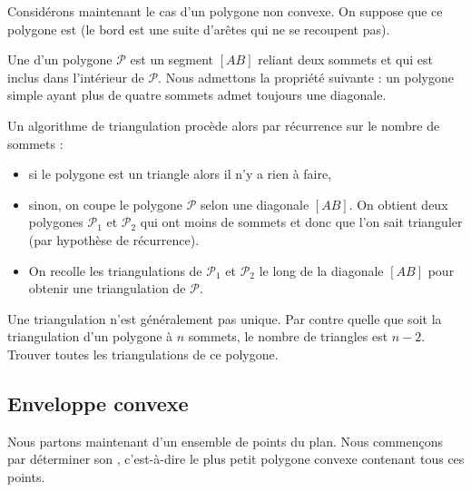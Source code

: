\documentclass[11pt,class=report,crop=false]{standalone}
\begin{document}

Considérons maintenant le cas d'un polygone non convexe. On suppose que ce polygone est  (le bord est une suite d'arêtes qui ne se recoupent pas).

Une  d'un polygone $\mathcal{P}$ est un segment $[AB]$ reliant deux sommets et qui est inclus dans l'intérieur de $\mathcal{P}$. Nous admettons la propriété suivante : un polygone simple ayant plus de quatre sommets admet toujours une diagonale.




Un algorithme de triangulation procède alors par récurrence sur le nombre de sommets :
\begin{itemize}
	\item si le polygone est un triangle alors il n'y a rien à faire,
	\item sinon, on coupe le polygone $\mathcal{P}$ selon une diagonale $[AB]$.
	On obtient deux polygones $\mathcal{P}_1$ et $\mathcal{P}_2$ qui ont moins de sommets et donc que l'on sait trianguler (par  hypothèse de récurrence).
	\item On recolle les triangulations de $\mathcal{P}_1$ et $\mathcal{P}_2$ le long de la diagonale $[AB]$ pour obtenir une triangulation de $\mathcal{P}$.
\end{itemize}





Une triangulation n'est généralement pas unique.
Par contre quelle que soit la triangulation d'un polygone à $n$ sommets, le nombre de triangles est $n-2$.
Trouver toutes les triangulations de ce polygone.



\subsection{Enveloppe convexe}


Nous partons maintenant d'un ensemble de points du plan. Nous commençons par déterminer son , c'est-à-dire le plus petit polygone convexe contenant tous ces  points.
\end{document}
